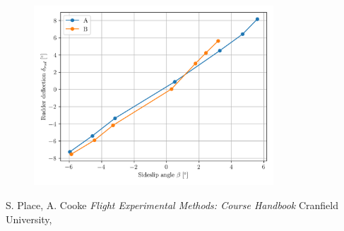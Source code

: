 \documentclass{article}
\begin{document}
\begin{figure}[H]
    \centering
    \includegraphics[width=0.8\textwidth]{Lat_Directional_Static_Stability_SHSS_3.png}
    \caption{}
    \label{fig:Lat_Directional_Static_Stability_SHSS_3}
\end{figure}


\begin{thebibliography}{9}

  S. Place, A. Cooke
  \emph{Flight Experimental Methods: Course Handbook}
  Cranfield University,

\end{thebibliography}
\end{document}
